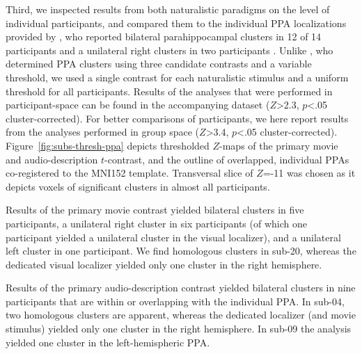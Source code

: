 \documentclass[english]{article}
\begin{document}
Third, we inspected results from both naturalistic paradigms on the level of
individual participants, and compared them to the individual PPA localizations
provided by \cite{sengupta2016extension}, who reported
bilateral parahippocampal clusters in 12 of 14
participants and a unilateral right clusters in two participants
\citep[Tab.~3 in][]{sengupta2016extension}.
Unlike \cite{sengupta2016extension}, who determined PPA clusters using three
candidate contrasts and a variable threshold, we used a single contrast for
each naturalistic stimulus and a uniform threshold for all participants.
Results of the analyses that were performed in participant-space can be found in the
accompanying dataset ($Z$>2.3, $p$<.05 cluster-corrected).
For better comparisons of participants, we here report results from the analyses
performed in group space ($Z$>3.4, $p$<.05 cluster-corrected).
Figure~\ref{fig:subs-thresh-ppa} depicts thresholded $Z$-maps of the primary movie
and audio-description $t$-contrast, and the outline of overlapped, individual PPAs
co-registered to the MNI152 template.
Transversal slice of $Z$=-11 was chosen as it depicts voxels of
significant clusters in almost all participants.

Results of the primary movie contrast yielded bilateral clusters in five participants,
a unilateral right cluster in six participants (of which one participant yielded a
unilateral cluster in the visual localizer), and a unilateral left cluster in
one participant.
We find homologous clusters in sub-20, whereas the dedicated visual localizer
yielded only one cluster in the right hemisphere.

Results of the primary audio-description contrast yielded bilateral clusters in nine participants
that are within or overlapping with the individual PPA.
In sub-04, two homologous clusters are apparent, whereas the dedicated localizer
(and movie stimulus) yielded only one cluster in the right hemisphere.
In sub-09 the analysis yielded one cluster in the left-hemispheric PPA.
\end{document}
